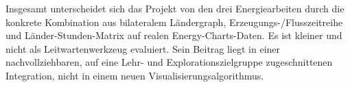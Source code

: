 Insgesamt unterscheidet sich das Projekt von den drei Energiearbeiten durch
die konkrete Kombination aus bilateralem Ländergraph, Erzeugungs-/Flusszeitreihe
und Länder-Stunden-Matrix auf realen Energy-Charts-Daten. Es ist kleiner und
nicht als Leitwartenwerkzeug evaluiert. Sein Beitrag liegt in einer
nachvollziehbaren, auf eine Lehr- und Explorationszielgruppe zugeschnittenen
Integration, nicht in einem neuen Visualisierungsalgorithmus.
